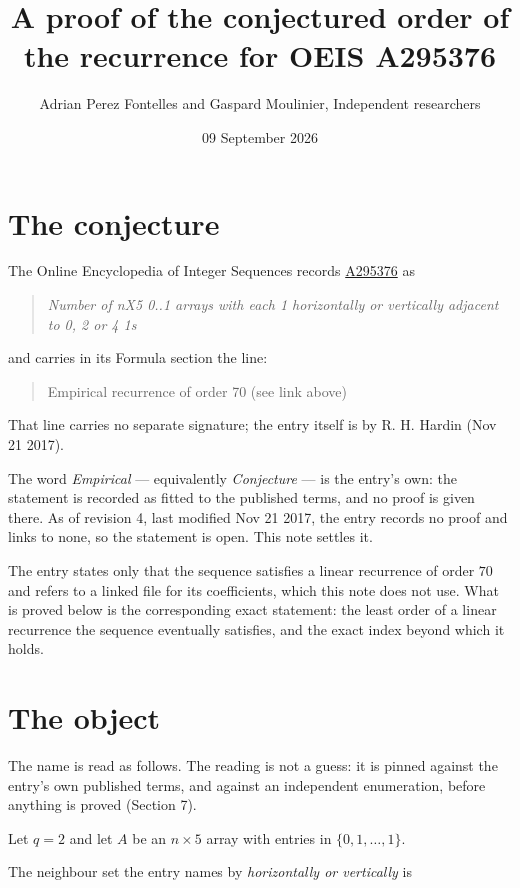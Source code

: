 \documentclass[11pt]{article}
\title{A proof of the conjectured order of the recurrence for OEIS A295376}
\author{Adrian Perez Fontelles and Gaspard Moulinier, Independent researchers}
\date{09 September 2026}
\theoremstyle{definition}
\begin{document}
\maketitle
\section{The conjecture}

The Online Encyclopedia of Integer Sequences records \href{https://oeis.org/A295376}{A295376} as

\begin{quote}\itshape Number of nX5 0..1 arrays with each 1 horizontally or vertically adjacent to 0, 2 or 4 1s\end{quote}

and carries in its Formula section the line:

\begin{quote}\ttfamily Empirical recurrence of order 70 (see link above)\end{quote}

That line carries no separate signature; the entry itself is by R. H. Hardin (Nov 21 2017).

The word {\itshape Empirical} --- equivalently {\itshape Conjecture} --- is the entry's own: the statement is recorded as fitted to the published terms, and no proof is given there. As of revision 4, last modified Nov 21 2017, the entry records no proof and links to none, so the statement is open. This note settles it.

The entry states only that the sequence satisfies a linear recurrence of order $70$ and refers to a linked file for its coefficients, which this note does not use. What is proved below is the corresponding exact statement: the least order of a linear recurrence the sequence eventually satisfies, and the exact index beyond which it holds.

\section{The object}

The name is read as follows. The reading is not a guess: it is pinned against the entry's own published terms, and against an independent enumeration, before anything is proved (Section 7).

Let $q = 2$ and let $A$ be an $n \times 5$ array with entries in $\{0,1,\dots,1\}$.

The neighbour set the entry names by {\itshape horizontally or vertically} is
\end{document}

